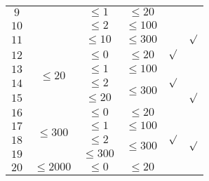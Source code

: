 \begin{example}
\begin{center}
\begin{tabular}{c|c|c|c|c|c}
				\cline{1-1}\cline{3-4}\cline{6-6}
				$9$    &                              & $\leq 1$                     & $\leq 20$                   &                          & \multirow{2}{*}{\times}  \\
				\cline{1-1}\cline{3-5}
				$10$   &                              & $\leq 2$                     & $\leq 100$                  & \multirow{2}{*}{\times}  &                          \\
				\cline{1-1}\cline{3-4}\cline{6-6}
				$11$   &                              & $\leq 10$                    & $\leq 300$                  &                          & $\surd$                  \\
				\hline
				$12$   & \multirow{4}{*}{$\leq 20$}   & $\leq 0$                     & $\leq 20$                   & $\surd$                  & \multirow{3}{*}{\times}  \\
				\cline{1-1}\cline{3-5}
				$13$   &                              & $\leq 1$                     & $\leq 100$                  & \times                   &                          \\
				\cline{1-1}\cline{3-5}
				$14$   &                              & $\leq 2$                     & \multirow{2}{*}{$\leq 300$} & $\surd$                                             \\
				\cline{1-1}\cline{3-3}\cline{5-6}
				$15$   &                              & $\leq 20$                    &                             & \multirow{3}{*}{\times}  & $\surd$                  \\
				\cline{1-4}\cline{6-6}
				$16$   & \multirow{4}{*}{$\leq 300$}  & $\leq 0$                     & $\leq 20$                   &                          & \multirow{2}{*}{\times}  \\
				\cline{1-1}\cline{3-4}
				$17$   &                              & $\leq 1$                     & $\leq 100$                  &                                                     \\
				\cline{1-1}\cline{3-6}
				$18$   &                              & $\leq 2$                     & \multirow{2}{*}{$\leq 300$} & $\surd$                  & \multirow{2}{*}{$\surd$} \\
				\cline{1-1}\cline{3-3}\cline{5-5}
				$19$   &                              & $\leq 300$                   &                             & \multirow{7}{*}{\times}  &                          \\
				\cline{1-4}\cline{6-6}
				$20$   & \multirow{6}{*}{$\leq 2000$} & $\leq 0$                     & \multirow{2}{*}{$\leq 20$}  &                          & \multirow{6}{*}{\times}  \\

\end{tabular}
\end{center}
\end{example}
